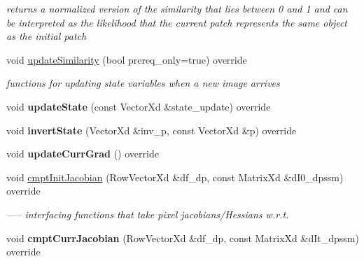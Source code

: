 \begin{DoxyCompactItemize}
\begin{DoxyCompactList}\small\item\em returns a normalized version of the similarity that lies between 0 and 1 and can be interpreted as the likelihood that the current patch represents the same object as the initial patch \end{DoxyCompactList}\item 
void \hyperlink{classSSDBase_abc7ddc50c9f32bbf1a5b7da932d006cf}{update\-Similarity} (bool prereq\-\_\-only=true) override
\begin{DoxyCompactList}\small\item\em functions for updating state variables when a new image arrives \end{DoxyCompactList}\item 
\hypertarget{classSSDBase_a95e3fcd4c412c756b1768fb7819966f9}{void {\bfseries update\-State} (const Vector\-Xd \&state\-\_\-update) override}\label{classSSDBase_a95e3fcd4c412c756b1768fb7819966f9}

\item 
\hypertarget{classSSDBase_a67f83bc7297152b2ac6d4226109aa861}{void {\bfseries invert\-State} (Vector\-Xd \&inv\-\_\-p, const Vector\-Xd \&p) override}\label{classSSDBase_a67f83bc7297152b2ac6d4226109aa861}

\item 
\hypertarget{classSSDBase_a771f6f5517efebd4767409a45436fba1}{void {\bfseries update\-Curr\-Grad} () override}\label{classSSDBase_a771f6f5517efebd4767409a45436fba1}

\item 
void \hyperlink{classSSDBase_a0319b0f1227303aecf5433512ec3b29f}{cmpt\-Init\-Jacobian} (Row\-Vector\-Xd \&df\-\_\-dp, const Matrix\-Xd \&d\-I0\-\_\-dpssm) override
\begin{DoxyCompactList}\small\item\em ----- interfacing functions that take pixel jacobians/\-Hessians w.\-r.\-t. \end{DoxyCompactList}\item 
\hypertarget{classSSDBase_abc33ed1f9be0347122253d6e84fa66d3}{void {\bfseries cmpt\-Curr\-Jacobian} (Row\-Vector\-Xd \&df\-\_\-dp, const Matrix\-Xd \&d\-It\-\_\-dpssm) override}\label{classSSDBase_abc33ed1f9be0347122253d6e84fa66d3}


\end{DoxyCompactItemize}
